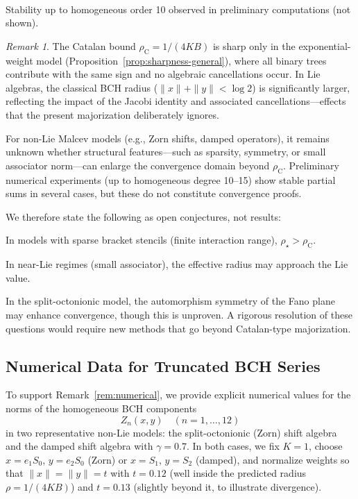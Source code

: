 \documentclass[11pt]{amsart}
\numberwithin{equation}{section}
\theoremstyle{remark}
\newtheorem{remark}[theorem]{Remark}
\begin{document}
\noindent\textsuperscript{\textdagger}Stability up to homogeneous order 10 observed in preliminary computations (not shown).

\medskip


\medskip
\begin{remark}
The Catalan bound $\rho_{\mathrm{C}} = 1/(4KB)$ is sharp  only  in the exponential-weight model (Proposition~\ref{prop:sharpness-general}), where all binary trees contribute with the same sign and no algebraic cancellations occur. In Lie algebras, the classical BCH radius ($\|x\| + \|y\| < \log 2$) is significantly larger, reflecting the impact of the Jacobi identity and associated cancellations—effects that the present majorization deliberately ignores.

For non-Lie Malcev models (e.g., Zorn shifts, damped operators), it remains unknown whether structural features—such as sparsity, symmetry, or small associator norm—can enlarge the convergence domain beyond $\rho_{\mathrm{C}}$. Preliminary numerical experiments (up to homogeneous degree 10–15) show stable partial sums in several cases, but these do not constitute convergence proofs.

We therefore state the following as open conjectures, not results:
\item In models with sparse bracket stencils (finite interaction range), $\rho_\star > \rho_{\mathrm{C}}$.
\item In near-Lie regimes (small associator), the effective radius may approach the Lie value.
\item In the split-octonionic model, the automorphism symmetry of the Fano plane may enhance convergence, though this is unproven.
A rigorous resolution of these questions would require new methods that go beyond Catalan-type majorization.
\end{remark}
\noindent
\subsection{ Numerical Data for Truncated BCH Series}
\label{subsec:numerical-data}

To support Remark~\ref{rem:numerical}, we provide explicit numerical values for the norms of the homogeneous BCH components
\[
Z_n(x,y) \quad (n=1,\dots,12)
\]
in two representative non-Lie models: the split-octonionic (Zorn) shift algebra and the damped shift algebra with $\gamma = 0.7$. In both cases, we fix $K=1$, choose $x = e_1 S_0$, $y = e_2 S_0$ (Zorn) or $x = S_1$, $y = S_2$ (damped), and normalize weights so that $\|x\| = \|y\| = t$ with $t = 0.12$ (well inside the predicted radius $\rho = 1/(4KB)$) and $t = 0.13$ (slightly beyond it, to illustrate divergence).
\end{document}
